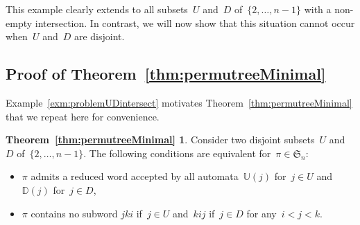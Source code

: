 \documentclass[11pt]{article}
\theoremstyle{definition}
\numberwithin{equation}{section}
\newcommand{\fS}{\mathfrak{S}}
\newcommand{\automatonU}{\mathbb{U}}
\newcommand{\automatonD}{\mathbb{D}}
\begin{document}
This example clearly extends to all subsets~$U$ and~$D$ of~$\{2, \dots, n-1\}$ with a non-empty intersection.
In contrast, we will now show that this situation cannot occur when~$U$ and~$D$ are disjoint.

\subsection{Proof of Theorem~\ref{thm:permutreeMinimal}}

Example~\ref{exm:problemUDintersect} motivates Theorem~\ref{thm:permutreeMinimal} that we repeat here for convenience.

\newtheorem*{thm:permutreeMinimal}{Theorem~\ref{thm:permutreeMinimal}}
\begin{thm:permutreeMinimal}
Consider two disjoint subsets~$U$ and~$D$ of~$\{2, \dots, n-1\}$.
The following conditions are equivalent for~$\pi \in \fS_n$:
\begin{itemize}
\item $\pi$ admits a reduced word accepted by all automata~$\automatonU(j)$ for~$j \in U$ and~$\automatonD(j)$ for~${j \in D}$,
\item $\pi$ contains no subword $jki$ if~$j \in U$ and~$kij$ if~$j \in D$ for any~$i < j < k$.
\end{itemize}
\end{thm:permutreeMinimal}
\end{document}
